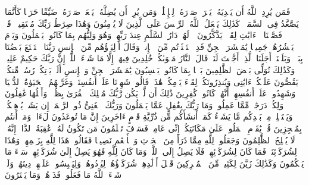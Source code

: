 \stopbuffer
\startbuffer[\q:6:125]
فَمَن یُرِدِ ٱللَّهُ أَن یَهۡدِیَهُۥ یَشۡرَحۡ صَدۡرَهُۥ لِلۡإِسۡلَٰمِۖ وَمَن یُرِدۡ أَن یُضِلَّهُۥ یَجۡعَلۡ صَدۡرَهُۥ ضَیِّقًا حَرَجࣰا كَأَنَّمَا یَصَّعَّدُ فِی ٱلسَّمَاۤءِۚ كَذَٰلِكَ یَجۡعَلُ ٱللَّهُ ٱلرِّجۡسَ عَلَى ٱلَّذِینَ لَا یُؤۡمِنُونَ%
\stopbuffer
\startbuffer[\q:6:126]
وَهَٰذَا صِرَٰطُ رَبِّكَ مُسۡتَقِیمࣰاۗ قَدۡ فَصَّلۡنَا ٱلۡءَایَٰتِ لِقَوۡمࣲ یَذَّكَّرُونَ%
\stopbuffer
\startbuffer[\q:6:127]
۞ لَهُمۡ دَارُ ٱلسَّلَٰمِ عِندَ رَبِّهِمۡۖ وَهُوَ وَلِیُّهُم بِمَا كَانُوا۟ یَعۡمَلُونَ%
\stopbuffer
\startbuffer[\q:6:128]
وَیَوۡمَ یَحۡشُرُهُمۡ جَمِیعࣰا یَٰمَعۡشَرَ ٱلۡجِنِّ قَدِ ٱسۡتَكۡثَرۡتُم مِّنَ ٱلۡإِنسِۖ وَقَالَ أَوۡلِیَاۤؤُهُم مِّنَ ٱلۡإِنسِ رَبَّنَا ٱسۡتَمۡتَعَ بَعۡضُنَا بِبَعۡضࣲ وَبَلَغۡنَاۤ أَجَلَنَا ٱلَّذِیۤ أَجَّلۡتَ لَنَاۚ قَالَ ٱلنَّارُ مَثۡوَىٰكُمۡ خَٰلِدِینَ فِیهَاۤ إِلَّا مَا شَاۤءَ ٱللَّهُۗ إِنَّ رَبَّكَ حَكِیمٌ عَلِیمࣱ%
\stopbuffer
\startbuffer[\q:6:129]
وَكَذَٰلِكَ نُوَلِّی بَعۡضَ ٱلظَّٰلِمِینَ بَعۡضَۢا بِمَا كَانُوا۟ یَكۡسِبُونَ%
\stopbuffer
\startbuffer[\q:6:130]
یَٰمَعۡشَرَ ٱلۡجِنِّ وَٱلۡإِنسِ أَلَمۡ یَأۡتِكُمۡ رُسُلࣱ مِّنكُمۡ یَقُصُّونَ عَلَیۡكُمۡ ءَایَٰتِی وَیُنذِرُونَكُمۡ لِقَاۤءَ یَوۡمِكُمۡ هَٰذَاۚ قَالُوا۟ شَهِدۡنَا عَلَىٰۤ أَنفُسِنَاۖ وَغَرَّتۡهُمُ ٱلۡحَیَوٰةُ ٱلدُّنۡیَا وَشَهِدُوا۟ عَلَىٰۤ أَنفُسِهِمۡ أَنَّهُمۡ كَانُوا۟ كَٰفِرِینَ%
\stopbuffer
\startbuffer[\q:6:131]
ذَٰلِكَ أَن لَّمۡ یَكُن رَّبُّكَ مُهۡلِكَ ٱلۡقُرَىٰ بِظُلۡمࣲ وَأَهۡلُهَا غَٰفِلُونَ%
\stopbuffer
\startbuffer[\q:6:132]
وَلِكُلࣲّ دَرَجَٰتࣱ مِّمَّا عَمِلُوا۟ۚ وَمَا رَبُّكَ بِغَٰفِلٍ عَمَّا یَعۡمَلُونَ%
\stopbuffer
\startbuffer[\q:6:133]
وَرَبُّكَ ٱلۡغَنِیُّ ذُو ٱلرَّحۡمَةِۚ إِن یَشَأۡ یُذۡهِبۡكُمۡ وَیَسۡتَخۡلِفۡ مِنۢ بَعۡدِكُم مَّا یَشَاۤءُ كَمَاۤ أَنشَأَكُم مِّن ذُرِّیَّةِ قَوۡمٍ ءَاخَرِینَ%
\stopbuffer
\startbuffer[\q:6:134]
إِنَّ مَا تُوعَدُونَ لَءَاتࣲۖ وَمَاۤ أَنتُم بِمُعۡجِزِینَ%
\stopbuffer
\startbuffer[\q:6:135]
قُلۡ یَٰقَوۡمِ ٱعۡمَلُوا۟ عَلَىٰ مَكَانَتِكُمۡ إِنِّی عَامِلࣱۖ فَسَوۡفَ تَعۡلَمُونَ مَن تَكُونُ لَهُۥ عَٰقِبَةُ ٱلدَّارِۚ إِنَّهُۥ لَا یُفۡلِحُ ٱلظَّٰلِمُونَ%
\stopbuffer
\startbuffer[\q:6:136]
وَجَعَلُوا۟ لِلَّهِ مِمَّا ذَرَأَ مِنَ ٱلۡحَرۡثِ وَٱلۡأَنۡعَٰمِ نَصِیبࣰا فَقَالُوا۟ هَٰذَا لِلَّهِ بِزَعۡمِهِمۡ وَهَٰذَا لِشُرَكَاۤئِنَاۖ فَمَا كَانَ لِشُرَكَاۤئِهِمۡ فَلَا یَصِلُ إِلَى ٱللَّهِۖ وَمَا كَانَ لِلَّهِ فَهُوَ یَصِلُ إِلَىٰ شُرَكَاۤئِهِمۡۗ سَاۤءَ مَا یَحۡكُمُونَ%
\stopbuffer
\startbuffer[\q:6:137]
وَكَذَٰلِكَ زَیَّنَ لِكَثِیرࣲ مِّنَ ٱلۡمُشۡرِكِینَ قَتۡلَ أَوۡلَٰدِهِمۡ شُرَكَاۤؤُهُمۡ لِیُرۡدُوهُمۡ وَلِیَلۡبِسُوا۟ عَلَیۡهِمۡ دِینَهُمۡۖ وَلَوۡ شَاۤءَ ٱللَّهُ مَا فَعَلُوهُۖ فَذَرۡهُمۡ وَمَا یَفۡتَرُونَ%
\stopbuffer
